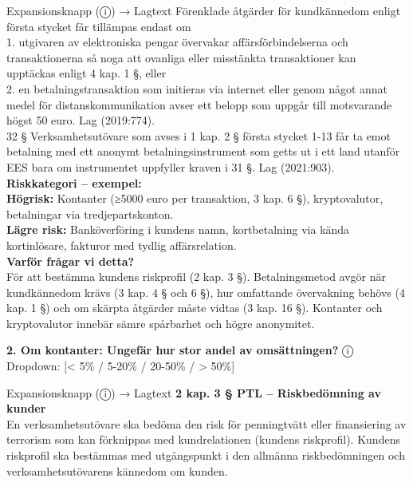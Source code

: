 \documentclass[10pt]{beamer}
\begin{document}
\begin{frame}[label=riskfragor-steg3]
\begin{alertblock}{Expansionsknapp (ⓘ) → Lagtext}
    Förenklade åtgärder för kundkännedom enligt första stycket får tillämpas endast om\\
    1. utgivaren av elektroniska pengar övervakar affärsförbindelserna och transaktionerna 
    så noga att ovanliga eller misstänkta transaktioner kan upptäckas enligt 4 kap. 1 §, eller\\
    2. en betalningstransaktion som initieras via internet eller genom något annat medel för distanskommunikation avser ett belopp som uppgår till motsvarande högst 50 euro.
    Lag (2019:774).\\

    32 §   Verksamhetsutövare som avses i 1 kap. 2 § första stycket 1-13 får ta emot betalning med 
    ett anonymt betalningsinstrument som getts ut i ett land utanför EES bara om instrumentet 
    uppfyller kraven i 31 §. Lag (2021:903).\\[0.1cm]

    \tiny \textbf{Riskkategori – exempel:}\\
    \tiny \textbf{Högrisk:} Kontanter (≥5000 euro per transaktion, 3 kap. 6 §), kryptovalutor, betalningar via tredjepartskonton.\\
    \tiny \textbf{Lägre risk:} Banköverföring i kundens namn, kortbetalning via kända kortinlösare, fakturor med tydlig affärsrelation.\\[0.1cm]
    \tiny \textbf{Varför frågar vi detta?}\\
    \tiny För att bestämma kundens riskprofil (2 kap. 3 §). Betalningsmetod avgör när kundkännedom krävs (3 kap. 4 § och 6 §), hur omfattande övervakning behövs (4 kap. 1 §) och om skärpta åtgärder måste vidtas (3 kap. 16 §). Kontanter och kryptovalutor innebär sämre spårbarhet och högre anonymitet.
  \end{alertblock}

  \vspace{0.3cm}

  \textbf{2. Om kontanter: Ungefär hur stor andel av omsättningen?} \hspace{0.3cm} ⓘ\\
  Dropdown: [< 5\% / 5-20\% / 20-50\% / > 50\%]
  \begin{alertblock}{Expansionsknapp (ⓘ) → Lagtext}
    \tiny \textbf{2 kap. 3 § PTL – Riskbedömning av kunder}\\
    \tiny En verksamhetsutövare ska bedöma den risk för penningtvätt eller finansiering av terrorism som kan
    förknippas med kundrelationen (kundens riskprofil). Kundens riskprofil ska bestämmas med utgångspunkt 
    i den allmänna riskbedömningen och verksamhetsutövarens kännedom om kunden.\\


\end{alertblock}
\end{frame}
\end{document}
